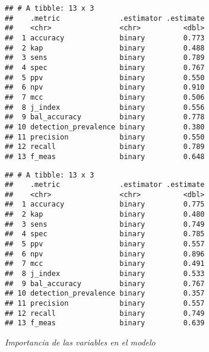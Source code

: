 \documentclass[
]{article}
\newenvironment{Shaded}{\begin{snugshade}}{\end{snugshade}}
\newcommand{\AttributeTok}[1]{\textcolor[rgb]{0.13,0.29,0.53}{#1}}
\newcommand{\FunctionTok}[1]{\textcolor[rgb]{0.13,0.29,0.53}{\textbf{#1}}}
\newcommand{\NormalTok}[1]{#1}
\newcommand{\SpecialCharTok}[1]{\textcolor[rgb]{0.81,0.36,0.00}{\textbf{#1}}}
\begin{document}
\begin{verbatim}
## # A tibble: 13 x 3
##    .metric              .estimator .estimate
##    <chr>                <chr>          <dbl>
##  1 accuracy             binary         0.773
##  2 kap                  binary         0.488
##  3 sens                 binary         0.789
##  4 spec                 binary         0.767
##  5 ppv                  binary         0.550
##  6 npv                  binary         0.910
##  7 mcc                  binary         0.506
##  8 j_index              binary         0.556
##  9 bal_accuracy         binary         0.778
## 10 detection_prevalence binary         0.380
## 11 precision            binary         0.550
## 12 recall               binary         0.789
## 13 f_meas               binary         0.648
\end{verbatim}

\begin{Shaded}
\end{Shaded}

\begin{verbatim}
## # A tibble: 13 x 3
##    .metric              .estimator .estimate
##    <chr>                <chr>          <dbl>
##  1 accuracy             binary         0.775
##  2 kap                  binary         0.480
##  3 sens                 binary         0.749
##  4 spec                 binary         0.785
##  5 ppv                  binary         0.557
##  6 npv                  binary         0.896
##  7 mcc                  binary         0.491
##  8 j_index              binary         0.533
##  9 bal_accuracy         binary         0.767
## 10 detection_prevalence binary         0.357
## 11 precision            binary         0.557
## 12 recall               binary         0.749
## 13 f_meas               binary         0.639
\end{verbatim}

\emph{Importancia de las variables en el modelo}
\end{document}
